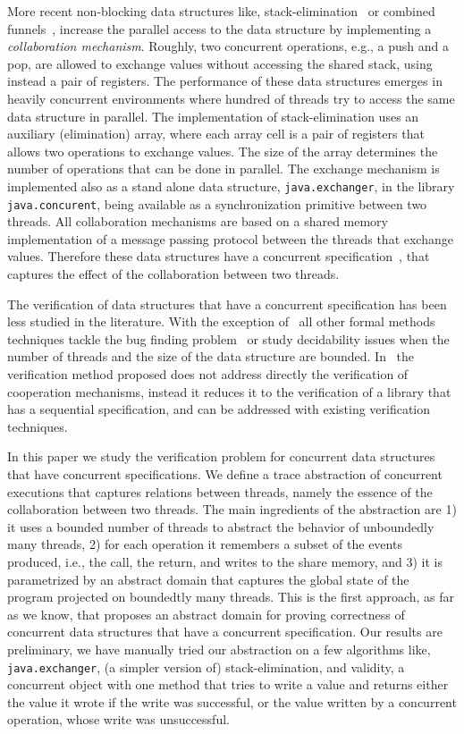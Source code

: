 More recent non-blocking data structures like, stack-elimination~\cite{elimination} or combined funnels~\cite{ShavitZ98}, increase the parallel access to the data structure by implementing a {\em collaboration mechanism}. Roughly, two concurrent operations, e.g., a push and a pop, are allowed to exchange values without accessing the shared stack, using instead a pair of registers. The performance of these data structures emerges in heavily concurrent environments  where hundred of threads try to access the same data structure in parallel. The implementation  of stack-elimination uses an auxiliary (elimination) array, where each array cell is a pair of registers that allows two operations to exchange values. The size of the array determines the number of operations that can be done in parallel.  
The exchange mechanism is implemented also as a stand alone data structure, \texttt{java.exchanger}, in the library \texttt{java.concurent}, being available as a synchronization primitive between two threads. 
All collaboration mechanisms are based on a shared memory implementation of a message passing protocol between the threads that exchange values. 
Therefore these data structures have a concurrent specification~\cite{disc15}, that captures the effect of the collaboration between two threads. 

The verification of data structures that have a concurrent specification has been less studied in the literature. With the exception of~\cite{cav13} all other formal methods techniques tackle the bug finding problem~\cite{ee1,ee2} or study decidability issues when the number of threads and the size of the data structure are bounded. In~\cite{cav13} the verification method proposed does not address directly the verification of cooperation mechanisms, instead it reduces it to the verification of a library that has a sequential specification, and can be addressed with existing verification techniques. 



In this paper we study the verification problem for concurrent data structures that have concurrent specifications. We define a trace abstraction of concurrent executions that captures relations between threads, namely the essence of the collaboration between two threads. 
The main ingredients of the abstraction are 1) it uses a bounded number of threads to abstract the behavior of unboundedly many  threads,  2) for each operation it remembers a subset of the events produced, i.e., the call, the return, and writes to the share memory, and 
 3) it is parametrized by an abstract domain that captures the global state of the program projected on boundedtly many threads. 
This is the first approach, as far as we know, that proposes an abstract domain for proving correctness of concurrent data structures that have a concurrent specification.  Our results are preliminary, we have manually tried our abstraction on a few algorithms like, \texttt{java.exchanger}, (a simpler version of) stack-elimination, and validity, a concurrent object with one method that tries to write a value and returns either the value it wrote if the write was successful, or the value written by a concurrent operation, whose write was unsuccessful.   
 
